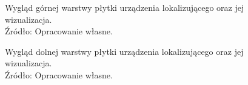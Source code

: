 \begin{figure}[H]
	\caption{Wygląd górnej warstwy płytki urządzenia lokalizującego oraz jej wizualizacja. \\ Źródło: Opracowanie własne.}
	\label{fig:image_mainboard_top_board}
\end{figure}

\begin{figure}[H]
\centering
	\qquad
	
	\caption{Wygląd dolnej warstwy płytki urządzenia lokalizującego oraz jej wizualizacja. \\ Źródło: Opracowanie własne.}
	\label{fig:image_mainboard_bottom_board}
\end{figure}